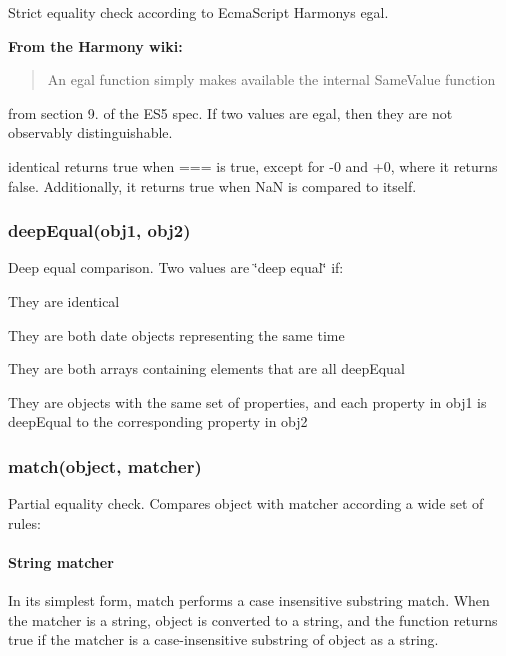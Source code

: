 Strict equality check according to Ecma\+Script Harmony\textquotesingle{}s {\ttfamily egal}.

{\bfseries From the Harmony wiki\+:}

\begin{quote}
An egal function simply makes available the internal {\ttfamily Same\+Value} function \end{quote}
from section 9. of the E\+S5 spec. If two values are egal, then they are not observably distinguishable.

{\ttfamily identical} returns {\ttfamily true} when {\ttfamily ===} is {\ttfamily true}, except for {\ttfamily -\/0} and {\ttfamily +0}, where it returns {\ttfamily false}. Additionally, it returns {\ttfamily true} when {\ttfamily NaN} is compared to itself.

\subsubsection*{{\ttfamily deep\+Equal(obj1, obj2)}}

Deep equal comparison. Two values are \char`\"{}deep equal\char`\"{} if\+:


\begin{DoxyItemize}
\item They are identical
\item They are both date objects representing the same time
\item They are both arrays containing elements that are all deep\+Equal
\item They are objects with the same set of properties, and each property in {\ttfamily obj1} is deep\+Equal to the corresponding property in {\ttfamily obj2}
\end{DoxyItemize}

\subsubsection*{{\ttfamily match(object, matcher)}}

Partial equality check. Compares {\ttfamily object} with matcher according a wide set of rules\+:

\paragraph*{String matcher}

In its simplest form, {\ttfamily match} performs a case insensitive substring match. When the matcher is a string, {\ttfamily object} is converted to a string, and the function returns {\ttfamily true} if the matcher is a case-\/insensitive substring of {\ttfamily object} as a string.


